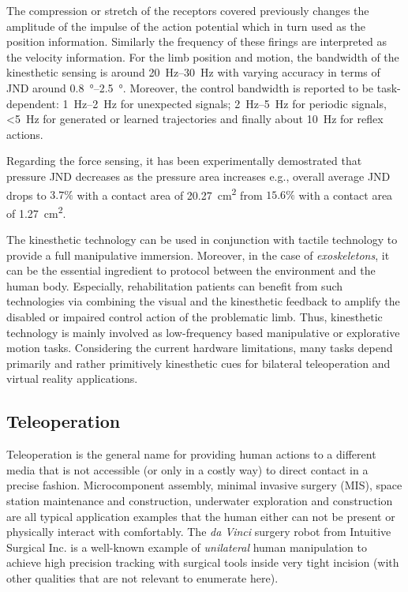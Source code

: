 The compression or stretch of the receptors covered previously changes the amplitude of the impulse of the action potential which in turn used as the position information. Similarly the frequency of these firings are interpreted as the velocity information. For the limb position and motion, the bandwidth of the kinesthetic sensing is around \SIrange{20}{30}{\hertz} with varying accuracy in terms of JND around \SIrange{0.8}{2.5}{\degree}. Moreover, the control bandwidth is reported to be task-dependent: \SIrange{1}{2}{\hertz} for unexpected signals; \SIrange{2}{5}{\hertz} for periodic signals, \SI[parse-numbers=false]{<5}{\hertz} for generated or learned trajectories and finally about \SI{10}{\hertz} for reflex actions. 

Regarding the force sensing, it has been experimentally demostrated that pressure JND decreases as the pressure area increases e.g., overall average JND drops to $3.7\%$ with a contact area of \SI{20.27}{\centi\meter\squared} from $15.6\%$ with a contact area of \SI{1.27}{\centi\meter\squared}. 

The kinesthetic technology can be used in conjunction with tactile technology to provide a full manipulative immersion. Moreover, in the case of \emph{exoskeletons}, it can be the essential ingredient to protocol between the environment and the human body. Especially, rehabilitation patients can benefit from such technologies via combining the visual and the kinesthetic feedback to amplify the disabled or impaired control action of the problematic limb. Thus, kinesthetic technology is mainly involved as low-frequency based manipulative or explorative motion tasks. Considering the current hardware limitations, many tasks depend primarily and rather primitively kinesthetic cues for bilateral teleoperation and virtual reality applications.


\subsection{Teleoperation}
Teleoperation is the general name for providing human actions to a different media that is not accessible (or only in a costly way) to direct contact in a precise fashion. Microcomponent assembly, minimal invasive surgery (MIS), space station maintenance and construction, underwater exploration and construction are all typical application examples that the human either can not be present or physically interact with comfortably. The \emph{da Vinci}\raisebox{0.5ex}{\scriptsize\texttrademark} surgery robot from Intuitive Surgical Inc. is a well-known example of \emph{unilateral} human manipulation to achieve high precision tracking with surgical tools inside very tight incision (with other qualities that are not relevant to enumerate here). 

